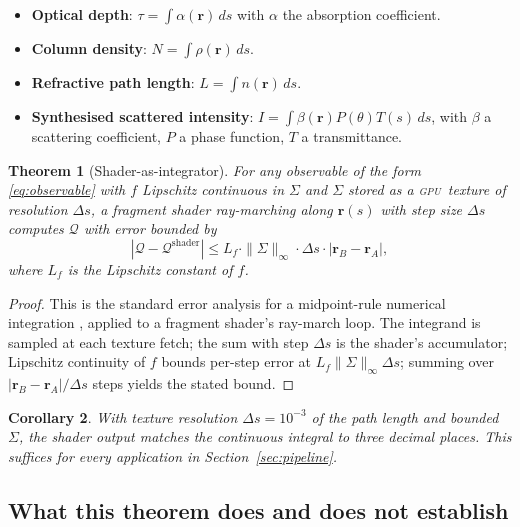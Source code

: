 \documentclass[11pt,twocolumn,a4paper]{article}
\newtheorem{theorem}{Theorem}[section]
\newtheorem{corollary}[theorem]{Corollary}
\theoremstyle{definition}
\theoremstyle{remark}
\newcommand{\gpu}{\textsc{gpu}}
\newcommand{\Rvec}{\mathbf{r}}
\newcommand{\Qobs}{\mathcal{Q}}
\newcommand{\Sigmaf}{\Sigma}
\begin{document}
\begin{itemize}[nosep,leftmargin=1em]
\item \textbf{Optical depth}: $\tau = \int \alpha(\Rvec)\,ds$ with $\alpha$ the absorption coefficient.
\item \textbf{Column density}: $N = \int \rho(\Rvec)\,ds$.
\item \textbf{Refractive path length}: $L = \int n(\Rvec)\,ds$.
\item \textbf{Synthesised scattered intensity}: $I = \int \beta(\Rvec) P(\theta) T(s)\,ds$, with $\beta$ a scattering coefficient, $P$ a phase function, $T$ a transmittance.
\end{itemize}

\begin{theorem}[Shader-as-integrator]\label{thm:shader}
For any observable of the form \eqref{eq:observable} with $f$ Lipschitz continuous in $\Sigmaf$ and $\Sigmaf$ stored as a \gpu\ texture of resolution $\Delta s$, a fragment shader ray-marching along $\Rvec(s)$ with step size $\Delta s$ computes $\Qobs$ with error bounded by
\begin{equation}
|\Qobs - \Qobs^\text{shader}| \leq L_f \cdot \|\Sigmaf\|_\infty \cdot \Delta s \cdot |\Rvec_B - \Rvec_A|,
\end{equation}
where $L_f$ is the Lipschitz constant of $f$.
\end{theorem}

\begin{proof}
This is the standard error analysis for a midpoint-rule numerical integration \citep{nr2007}, applied to a fragment shader's ray-march loop. The integrand is sampled at each texture fetch; the sum with step $\Delta s$ is the shader's accumulator; Lipschitz continuity of $f$ bounds per-step error at $L_f \|\Sigmaf\|_\infty \Delta s$; summing over $|\Rvec_B - \Rvec_A|/\Delta s$ steps yields the stated bound.
\end{proof}

\begin{corollary}
With texture resolution $\Delta s = 10^{-3}$ of the path length and bounded $\Sigmaf$, the shader output matches the continuous integral to three decimal places. This suffices for every application in Section~\ref{sec:pipeline}.
\end{corollary}

\subsection{What this theorem does and does not establish}
\end{document}
